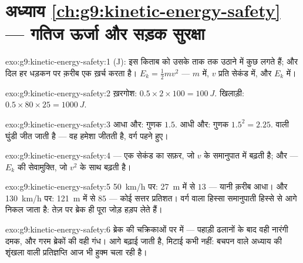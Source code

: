 \section*{अध्याय \ref{ch:g9:kinetic-energy-safety} --- गतिज ऊर्जा और सड़क सुरक्षा}

\begin{solution}{exo:g9:kinetic-energy-safety:1}
 (\unit{J}): इस किताब को उसके ताक तक उठाने में कुछ  लगते हैं;
और दिल हर धड़कन पर क़रीब एक  ख़र्च करता है। $E_k = \frac12 m v^2$
--- $m$  में, $v$  प्रति सेकंड में, और $E_k$  में।
\end{solution}

\begin{solution}{exo:g9:kinetic-energy-safety:2}
ख़रगोश: $0.5 \times 2 \times 100 = \qty{100}{J}$. खिलाड़ी: $0.5
\times 80 \times 25 = \qty{1000}{J}$.
\end{solution}

\begin{solution}{exo:g9:kinetic-energy-safety:3}
आधा  और: गुणक $1.5$. आधी  और: गुणक $1.5^2 = 2.25$. 
वाली घुंडी जीत जाती है --- वह हमेशा जीतती है, वर्ग पहने हुए।
\end{solution}

\begin{solution}{exo:g9:kinetic-energy-safety:4}
 --- एक सेकंड का सफ़र, जो $v$ के समानुपात में बढ़ती
है; और  --- $E_k$ की सेवामुक्ति, जो $v^2$ के साथ बढ़ती है।
\end{solution}

\begin{solution}{exo:g9:kinetic-energy-safety:5}
\qty{50}{km/h} पर: \qty{27}{m} में से $13$ --- यानी क़रीब आधा। और
\qty{130}{km/h} पर: \qty{121}{m} में से $85$ --- कोई सत्तर
प्रतिशत। वर्ग वाला हिस्सा समानुपाती हिस्से से आगे निकल जाता है: तेज़
 पर ब्रेक ही पूरा जोड़ हड़प लेते हैं।
\end{solution}

\begin{solution}{exo:g9:kinetic-energy-safety:6}
ब्रेक की चक्रिकाओं पर  में --- पहाड़ी ढलानों के बाद वही नारंगी
दमक, और गरम ब्रेकों की वही गंध।  आगे बढ़ाई जाती है, मिटाई कभी
नहीं: बचपन वाले  अध्याय की शृंखला वाली प्रतिज्ञप्ति आज भी हुक्म
चला रही है।
\end{solution}

